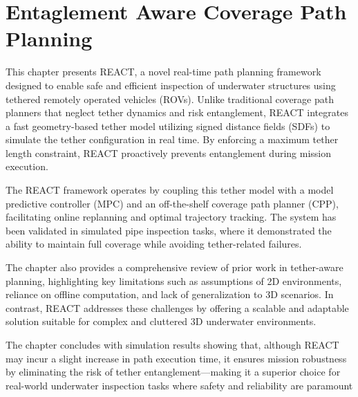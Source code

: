 \chapter{Entaglement Aware Coverage Path Planning}

This chapter presents REACT, a novel real-time path planning framework designed to enable safe and efficient inspection of underwater structures using tethered remotely operated vehicles (ROVs). Unlike traditional coverage path planners that neglect tether dynamics and risk entanglement, REACT integrates a fast geometry-based tether model utilizing signed distance fields (SDFs) to simulate the tether configuration in real time. By enforcing a maximum tether length constraint, REACT proactively prevents entanglement during mission execution.

The REACT framework operates by coupling this tether model with a model predictive controller (MPC) and an off-the-shelf coverage path planner (CPP), facilitating online replanning and optimal trajectory tracking. The system has been validated in simulated pipe inspection tasks, where it demonstrated the ability to maintain full coverage while avoiding tether-related failures.

The chapter also provides a comprehensive review of prior work in tether-aware planning, highlighting key limitations such as assumptions of 2D environments, reliance on offline computation, and lack of generalization to 3D scenarios. In contrast, REACT addresses these challenges by offering a scalable and adaptable solution suitable for complex and cluttered 3D underwater environments.

The chapter concludes with simulation results showing that, although REACT may incur a slight increase in path execution time, it ensures mission robustness by eliminating the risk of tether entanglement—making it a superior choice for real-world underwater inspection tasks where safety and reliability are paramount